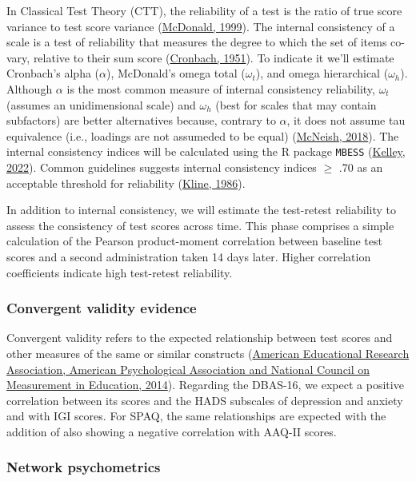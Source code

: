 \documentclass[
  ,doc,11pt, twoside,floatsintext]{apa6}
\begin{document}
In Classical Test Theory (CTT), the reliability of a test is the ratio of true score variance to test score variance (\protect\hyperlink{ref-mcdonald1999}{McDonald, 1999}). The internal consistency of a scale is a test of reliability that measures the degree to which the set of items co-vary, relative to their sum score (\protect\hyperlink{ref-cronbach1951}{Cronbach, 1951}). To indicate it we'll estimate Cronbach's alpha (\(\alpha\)), McDonald's omega total (\(\omega_t\)), and omega hierarchical (\(\omega_h\)). Although \(\alpha\) is the most common measure of internal consistency reliability, \(\omega_t\) (assumes an unidimensional scale) and \(\omega_h\) (best for scales that may contain subfactors) are better alternatives because, contrary to \(\alpha\), it does not assume tau equivalence (i.e., loadings are not assumeded to be equal) (\protect\hyperlink{ref-mcneish2018}{McNeish, 2018}). The internal consistency indices will be calculated using the R package \texttt{MBESS} (\protect\hyperlink{ref-MBESS}{Kelley, 2022}). Common guidelines suggests internal consistency indices \(\ge\) .70 as an acceptable threshold for reliability (\protect\hyperlink{ref-kline1986}{Kline, 1986}).

In addition to internal consistency, we will estimate the test-retest reliability to assess the consistency of test scores across time. This phase comprises a simple calculation of the Pearson product-moment correlation between baseline test scores and a second administration taken 14 days later. Higher correlation coefficients indicate high test-retest reliability.

\hypertarget{convergent-validity-evidence}{%
\subsubsection{Convergent validity evidence}\label{convergent-validity-evidence}}

Convergent validity refers to the expected relationship between test scores and other measures of the same or similar constructs (\protect\hyperlink{ref-standards2014}{American Educational Research Association, American Psychological Association and National Council on Measurement in Education, 2014}). Regarding the DBAS-16, we expect a positive correlation between its scores and the HADS subscales of depression and anxiety and with IGI scores. For SPAQ, the same relationships are expected with the addition of also showing a negative correlation with AAQ-II scores.

\hypertarget{network-psychometrics}{%
\subsubsection{Network psychometrics}\label{network-psychometrics}}
\end{document}

